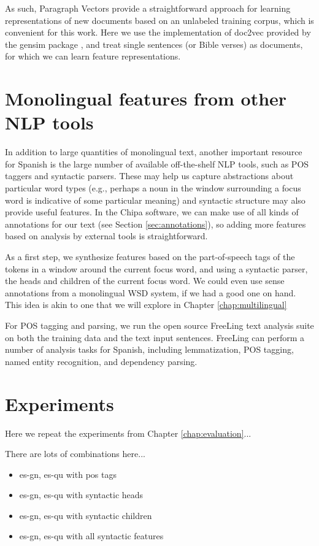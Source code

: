 As such, Paragraph Vectors provide a straightforward approach for learning
representations of new documents based on an unlabeled training corpus, which
is convenient for this work. Here we use the implementation of doc2vec provided
by the gensim package \cite{rehurek-lrec}, and treat single sentences (or Bible
verses) as documents, for which we can learn feature representations.

\section{Monolingual features from other NLP tools}
In addition to large quantities of monolingual text, another important resource
for Spanish is the large number of available off-the-shelf NLP tools, such as
POS taggers and syntactic parsers. These may help us capture abstractions about
particular word types (e.g., perhaps a noun in the window surrounding a focus
word is indicative of some particular meaning) and syntactic structure may also
provide useful features.  In the Chipa software, we can make use of all kinds
of annotations for our text (see Section \ref{sec:annotations}), so adding more
features based on analysis by external tools is straightforward.

As a first step, we synthesize features based on the part-of-speech tags of the
tokens in a window around the current focus word, and using a syntactic parser,
the heads and children of the current focus word.  We could even use sense
annotations from a monolingual WSD system, if we had a good one on hand. This
idea is akin to one that we will explore in Chapter \ref{chap:multilingual}

For POS tagging and parsing, we run the open source FreeLing text analysis
suite \cite{padro12} on both the training data and the text input sentences.
FreeLing can perform a number of analysis tasks for Spanish, including
lemmatization, POS tagging, named entity recognition, and dependency parsing.

\section{Experiments}
Here we repeat the experiments from Chapter \ref{chap:evaluation}...

There are lots of combinations here...

\begin{itemize}
  \item es-gn, es-qu with pos tags
  \item es-gn, es-qu with syntactic heads
  \item es-gn, es-qu with syntactic children
  \item es-gn, es-qu with all syntactic features
\end{itemize}

